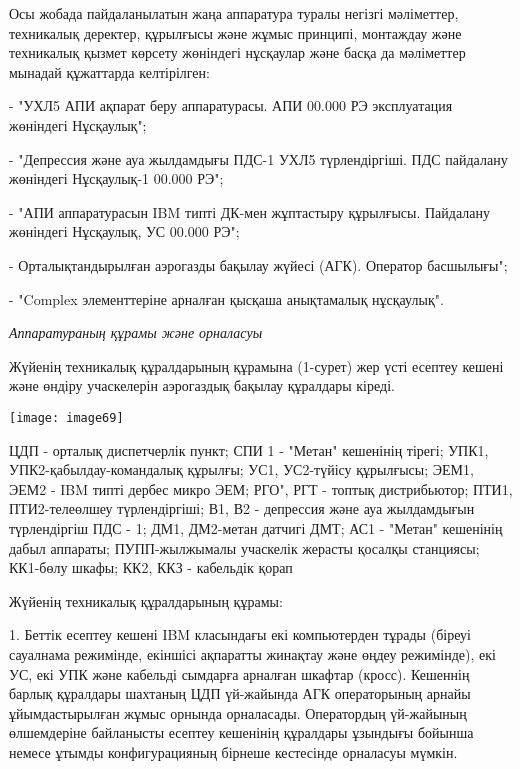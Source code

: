 \begin{multicols}{2}
Осы жобада пайдаланылатын жаңа аппаратура туралы негізгі мәліметтер,
техникалық деректер, құрылғысы және жұмыс принципі, монтаждау және
техникалық қызмет көрсету жөніндегі нұсқаулар және басқа да мәліметтер
мынадай құжаттарда келтірілген:

- "УХЛ5 АПИ ақпарат беру аппаратурасы. АПИ 00.000 РЭ эксплуатация
жөніндегі Нұсқаулық";

- "Депрессия және ауа жылдамдығы ПДС-1 УХЛ5 түрлендіргіші. ПДС пайдалану
жөніндегі Нұсқаулық-1 00.000 РЭ";

- "АПИ аппаратурасын IBM типті ДК-мен жұптастыру құрылғысы. Пайдалану
жөніндегі Нұсқаулық, УС 00.000 РЭ";

- Орталықтандырылған аэрогазды бақылау жүйесі (АГК). Оператор
басшылығы";

- "Complex элементтеріне арналған қысқаша анықтамалық нұсқаулық".

\emph{Аппаратураның құрамы және орналасуы}

Жүйенің техникалық құралдарының құрамына (1-сурет) жер үсті есептеу
кешені және өндіру учаскелерін аэрогаздық бақылау құралдары кіреді.

{\centering
\texttt{[image: image69]}
}

ЦДП - орталық диспетчерлік пункт; СПИ 1 - "Метан" кешенінің тірегі;
УПК1, УПК2-қабылдау-командалық құрылғы; УС1, УС2-түйісу құрылғысы; ЭЕМ1,
ЭЕМ2 - IBM типті дербес микро ЭЕМ; РГО", РГТ - топтық дистрибьютор;
ПТИ1, ПТИ2-телеөлшеу түрлендіргіші; В1, В2 - депрессия және ауа
жылдамдығын түрлендіргіш ПДС - 1; ДМ1, ДМ2-метан датчигі ДМТ; АС1 -
"Метан" кешенінің дабыл аппараты; ПУПП-жылжымалы учаскелік жерасты
қосалқы станциясы; КК1-бөлу шкафы; КК2, ККЗ - кабельдік қорап

Жүйенің техникалық құралдарының құрамы:

1. Беттік есептеу кешені IBM класындағы екі компьютерден тұрады (біреуі
сауалнама режимінде, екіншісі ақпаратты жинақтау және өңдеу режимінде),
екі УС, екі УПК және кабельді сымдарға арналған шкафтар (кросс).
Кешеннің барлық құралдары шахтаның ЦДП үй-жайында АГК операторының
арнайы ұйымдастырылған жұмыс орнында орналасады. Оператордың үй-жайының
өлшемдеріне байланысты есептеу кешенінің құралдары ұзындығы бойынша
немесе ұтымды конфигурацияның бірнеше кестесінде орналасуы мүмкін.



\end{multicols}

